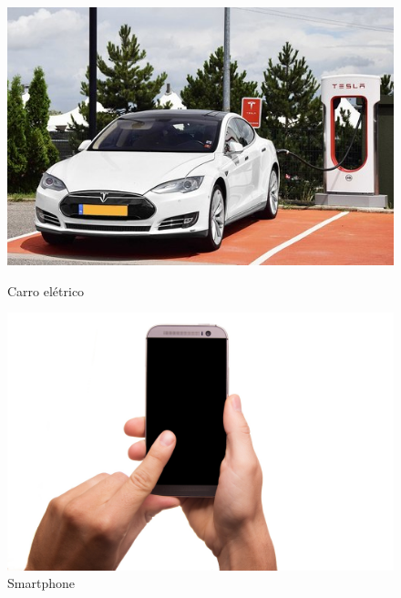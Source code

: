 \documentclass{beamer}
\begin{document}
\begin{frame}
\begin{figure}[!ht]
	\begin{minipage}{\textwidth}
  \begin{minipage}{.45\textwidth}
      \centering
      \includegraphics[width=.85\textwidth]{electric_car1}
      \caption{Carro elétrico}
			\label{fig:electric_car1}      
    \end{minipage}													\pause
  \begin{minipage}{.45\textwidth}
    \center
      \includegraphics[width=.85\textwidth]{smartphone1}
      \caption{Smartphone}
      \label{fig:smartphone1}
    \end{minipage}
  \end{minipage}

	\end{figure}
\end{frame}		
\end{document}
